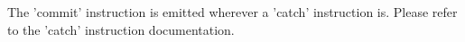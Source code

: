 The 'commit' instruction is emitted wherever a 'catch' instruction is.
Please refer to the 'catch' instruction documentation.
